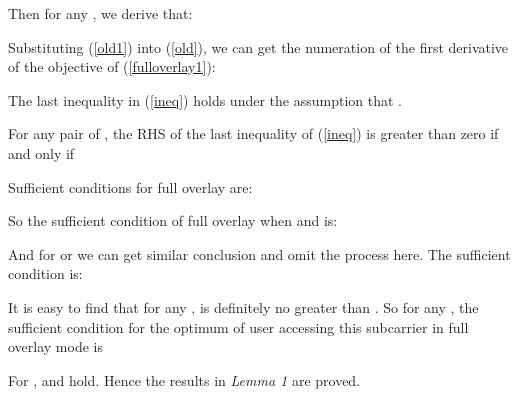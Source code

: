 \documentclass[journal]{IEEEtran}
\begin{document}
Then for any , we derive that:


Substituting (\ref{old1})  into (\ref{old}), we can get the numeration of the first derivative of the objective of (\ref{fulloverlay1}):


The last inequality  in (\ref{ineq}) holds under the assumption that .

For any pair of , the RHS of the last inequality of (\ref{ineq}) is greater than zero if and only if


Sufficient conditions for full overlay are:



 So the sufficient condition of full overlay when  and is:



And for  or  we can get similar conclusion and omit the process here. The
sufficient condition is:


It is easy to find that for any ,  is definitely no
greater than . So for any , the sufficient condition for the optimum of user  accessing this
subcarrier  in full overlay mode is 

For ,  and  hold. Hence the results in \emph{Lemma 1} are proved.











\ifCLASSOPTIONcaptionsoff
  \newpage
\fi









\end{document}

